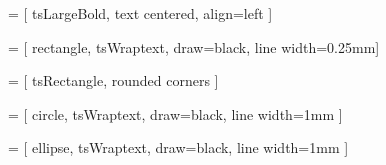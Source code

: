  = [ 
    tsLargeBold, 
    text centered, 
    align=left
]

 = [ 
    rectangle,
    tsWraptext,               
    draw=black,
    line width=0.25mm]

 = [  
    tsRectangle,
    rounded corners
]

 = [   
        circle,
        tsWraptext,
        draw=black,
        line width=1mm
    ]

 = [   
    ellipse,
    tsWraptext,
    draw=black,
    line width=1mm
]


%
%
\newcommand{\drawInstrFormat}[2]{%
  	
  	\begin{tikzpicture}[scale=0.7, transform shape]
    	\node[	tsRectangle, 
    			minimum width=16cm, 
    			minimum height=1cm, 
    			fill=white!50] at (8,1) {};

    	\pgfmathsetmacro{\last}{0}

    	\foreach [count=\i] \l in {#2} {%
      		\expandafter\xdef\csname label@\i\endcsname{\l}%
    	}

    	\foreach \p [count=\i] in {#1} {%
      		
      		\ifnum\i>1
        
        		\pgfmathsetmacro{\width}{\p-\last}
        
        		\pgfmathsetmacro{\center}{(\p+\last)/2}
        
        		\pgfmathtruncatemacro{\bits}{round(\width*2)}

        		\draw[-] (\p,0.5) -- (\p,1.5);

        		\node at (\center,0.25) {\bits};

        		\node at (\center,1) {\csname label@\the\numexpr\i-1\relax\endcsname};
      
      		\fi
      	\xdef\last{\p}
    }%
    
  	\end{tikzpicture}%
}

